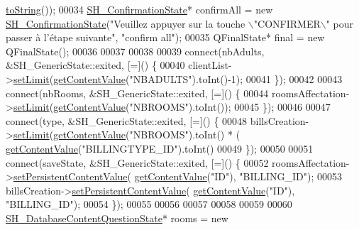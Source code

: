 \begin{DoxyCode}
      \hyperlink{classSH__GenericStateMachine_a85c0c1c9d258ae991f84667412fa47cd}{toString}());
00034     \hyperlink{classSH__ConfirmationState}{SH\_ConfirmationState}* confirmAll = \textcolor{keyword}{new} 
      \hyperlink{classSH__ConfirmationState}{SH\_ConfirmationState}(\textcolor{stringliteral}{"Veuillez appuyer sur la touche \(\backslash\)"CONFIRMER\(\backslash\)" pour passer à
       l'étape suivante"}, \textcolor{stringliteral}{"confirm all"});
00035     QFinalState* \textcolor{keyword}{final} = \textcolor{keyword}{new} QFinalState();
00036 
00037 
00038 
00039     connect(nbAdults, &SH\_GenericState::exited, [=]() \{
00040         clientList->\hyperlink{classSH__LoopingInOutStateMachine_a6dbf2fbcc6524bba5a70baadb8d61be4}{setLimit}(\hyperlink{classSH__InOutStateMachine_aa1a3bd3c0ea8a59b9bc916dc718eb9ca}{getContentValue}(\textcolor{stringliteral}{"NBADULTS"}).toInt()-1);
00041     \});
00042 
00043     connect(nbRooms, &SH\_GenericState::exited, [=]() \{
00044         roomsAffectation->\hyperlink{classSH__LoopingInOutStateMachine_a6dbf2fbcc6524bba5a70baadb8d61be4}{setLimit}(\hyperlink{classSH__InOutStateMachine_aa1a3bd3c0ea8a59b9bc916dc718eb9ca}{getContentValue}(\textcolor{stringliteral}{"NBROOMS"}).toInt());
00045     \});
00046 
00047     connect(type, &SH\_GenericState::exited, [=]() \{
00048         billsCreation->\hyperlink{classSH__LoopingInOutStateMachine_a6dbf2fbcc6524bba5a70baadb8d61be4}{setLimit}(\hyperlink{classSH__InOutStateMachine_aa1a3bd3c0ea8a59b9bc916dc718eb9ca}{getContentValue}(\textcolor{stringliteral}{"NBROOMS"}).toInt() * (
      \hyperlink{classSH__InOutStateMachine_aa1a3bd3c0ea8a59b9bc916dc718eb9ca}{getContentValue}(\textcolor{stringliteral}{"BILLINGTYPE\_ID"}).toInt() %
00049     \});
00050 
00051     connect(saveState, &SH\_GenericState::exited, [=]() \{
00052         roomsAffectation->\hyperlink{classSH__LoopingInOutStateMachine_a99686121d80e3de4c64bebb1d5890ac0}{setPersistentContentValue}(
      \hyperlink{classSH__InOutStateMachine_aa1a3bd3c0ea8a59b9bc916dc718eb9ca}{getContentValue}(\textcolor{stringliteral}{"ID"}), \textcolor{stringliteral}{"BILLING\_ID"});
00053         billsCreation->\hyperlink{classSH__LoopingInOutStateMachine_a99686121d80e3de4c64bebb1d5890ac0}{setPersistentContentValue}(
      \hyperlink{classSH__InOutStateMachine_aa1a3bd3c0ea8a59b9bc916dc718eb9ca}{getContentValue}(\textcolor{stringliteral}{"ID"}), \textcolor{stringliteral}{"BILLING\_ID"});
00054     \});
00055 
00056 
00057 
00058 
00059 
00060     \hyperlink{classSH__DatabaseContentQuestionState}{SH\_DatabaseContentQuestionState}* rooms = \textcolor{keyword}{new} 

\end{DoxyCode}
